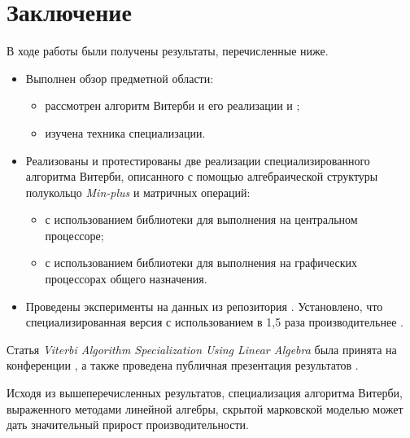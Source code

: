 \section{Заключение}
В ходе работы были получены результаты, перечисленные ниже.
\begin{itemize}
	\item Выполнен обзор предметной области:
		\begin{itemize}
			\item рассмотрен алгоритм Витерби и его реализации  и ;
			\item изучена техника специализации.
		\end{itemize}
	\item Реализованы и протестированы две реализации специализированного алгоритма Витерби, описанного с помощью алгебраической структуры полукольцо \emph{Min-plus} и матричных операций:
		\begin{itemize}
			\item с использованием библиотеки  для выполнения на центральном процессоре;
			\item с использованием библиотеки  для выполнения на графических процессорах общего назначения.
		\end{itemize}
	\item Проведены эксперименты на данных из репозитория . 
Установлено, что специализированная версия с использованием 
 в 1,5 раза 
производительнее .
\end{itemize}

Статья \emph{Viterbi Algorithm Specialization Using Linear 
Algebra} была принята на конференции , а 
также проведена публичная презентация результатов .

Исходя из вышеперечисленных результатов, специализация 
алгоритма Витерби, выраженного методами линейной алгебры, 
скрытой марковской моделью может дать значительный прирост 
производительности.
